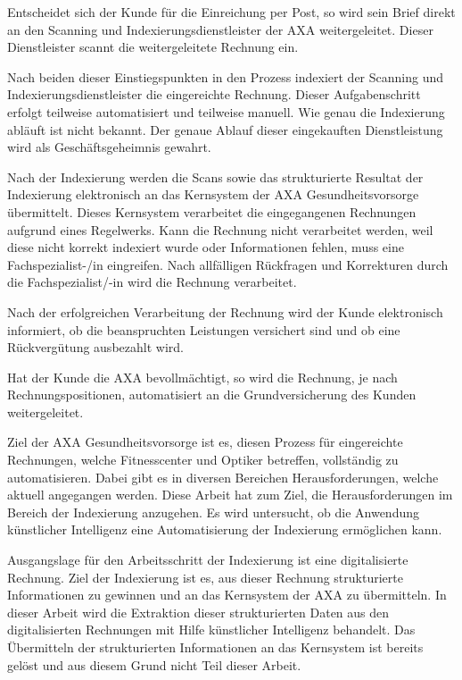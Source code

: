 Entscheidet sich der Kunde für die Einreichung per Post, so wird sein Brief direkt an den Scanning und Indexierungsdienstleister der AXA weitergeleitet. Dieser Dienstleister scannt die weitergeleitete Rechnung ein.

Nach beiden dieser Einstiegspunkten in den Prozess indexiert der Scanning und Indexierungsdienstleister die eingereichte Rechnung. Dieser Aufgabenschritt erfolgt teilweise automatisiert und teilweise manuell. Wie genau die Indexierung abläuft ist nicht bekannt. Der genaue Ablauf dieser eingekauften Dienstleistung wird als Geschäftsgeheimnis gewahrt.

Nach der Indexierung werden die Scans sowie das strukturierte Resultat der Indexierung elektronisch an das Kernsystem der AXA Gesundheitsvorsorge übermittelt. Dieses Kern\-system verarbeitet die eingegangenen Rechnungen aufgrund eines Regelwerks. Kann die Rechnung nicht verarbeitet werden, weil diese nicht korrekt indexiert wurde oder Informationen fehlen, muss eine Fachspezialist-/in eingreifen. Nach allfälligen Rückfragen und Korrekturen durch die Fachspezialist/-in wird die Rechnung verarbeitet. 

Nach der erfolgreichen Verarbeitung der Rechnung wird der Kunde elektronisch informiert, ob die beanspruchten Leistungen versichert sind und ob eine Rückvergütung ausbezahlt wird.

Hat der Kunde die AXA bevollmächtigt, so wird die Rechnung, je nach Rechnungspositionen, automatisiert an die Grundversicherung des Kunden weitergeleitet.

Ziel der AXA Gesundheitsvorsorge ist es, diesen Prozess für eingereichte Rechnungen, welche Fitnesscenter und Optiker betreffen, vollständig zu automatisieren. Dabei gibt es in diversen Bereichen Herausforderungen, welche aktuell angegangen werden. Diese Arbeit hat zum Ziel, die Herausforderungen im Bereich der Indexierung anzugehen. Es wird untersucht, ob die Anwendung künstlicher Intelligenz eine Automatisierung der Indexierung ermöglichen kann.

Ausgangslage für den Arbeitsschritt der Indexierung ist eine digitalisierte Rechnung. Ziel der Indexierung ist es, aus dieser Rechnung strukturierte Informationen zu gewinnen und an das Kernsystem der AXA zu übermitteln. In dieser Arbeit wird die Extraktion dieser strukturierten Daten aus den digitalisierten Rechnungen mit Hilfe künstlicher Intelligenz behandelt. Das Übermitteln der strukturierten Informationen an das Kernsystem ist bereits gelöst und aus diesem Grund nicht Teil dieser Arbeit.

